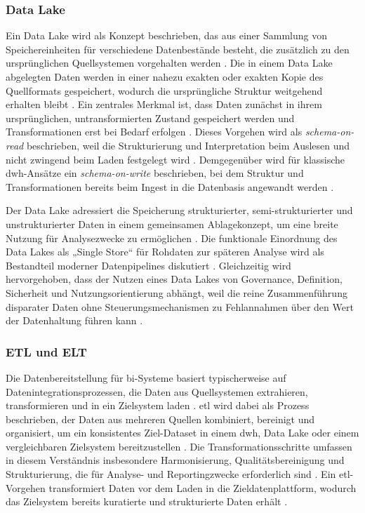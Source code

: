 \subsubsection{Data Lake}
Ein Data Lake wird als Konzept beschrieben, das aus einer Sammlung von Speichereinheiten für verschiedene Datenbestände besteht, die zusätzlich zu den ursprünglichen Quellsystemen vorgehalten werden \cite{GartnerDataLake}. Die in einem Data Lake abgelegten Daten werden in einer nahezu exakten oder exakten Kopie des Quellformats gespeichert, wodurch die ursprüngliche Struktur weitgehend erhalten bleibt \cite{GartnerDataLake}. Ein zentrales Merkmal ist, dass Daten zunächst in ihrem ursprünglichen, untransformierten Zustand gespeichert werden und Transformationen erst bei Bedarf erfolgen \cite{MSDataLakeGuide}. Dieses Vorgehen wird als \emph{schema-on-read} beschrieben, weil die Strukturierung und Interpretation beim Auslesen und nicht zwingend beim Laden festgelegt wird \cite{MSDataLakeGuide}. Demgegenüber wird für klassische \gls{dwh}-Ansätze ein \emph{schema-on-write} beschrieben, bei dem Struktur und Transformationen bereits beim Ingest in die Datenbasis angewandt werden \cite{MSDataLakeGuide}. 

Der Data Lake adressiert die Speicherung strukturierter, semi-strukturierter und unstrukturierter Daten in einem gemeinsamen Ablagekonzept, um eine breite Nutzung für Analysezwecke zu ermöglichen \cite{AWSDataLake}. Die funktionale Einordnung des Data Lakes als „Single Store“ für Rohdaten zur späteren Analyse wird als Bestandteil moderner Datenpipelines diskutiert \cite{Fowler2015DataLake}. Gleichzeitig wird hervorgehoben, dass der Nutzen eines Data Lakes von Governance, Definition, Sicherheit und Nutzungsorientierung abhängt, weil die reine Zusammenführung disparater Daten ohne Steuerungsmechanismen zu Fehlannahmen über den Wert der Datenhaltung führen kann \cite{GartnerDataLakeFallacy}. 

\subsubsection{ETL und ELT}
Die Datenbereitstellung für \gls{bi}-Systeme basiert typischerweise auf Datenintegrationsprozessen, die Daten aus Quellsystemen extrahieren, transformieren und in ein Zielsystem laden \cite{IBMETL}. \gls{etl} wird dabei als Prozess beschrieben, der Daten aus mehreren Quellen kombiniert, bereinigt und organisiert, um ein konsistentes Ziel-Dataset in einem \gls{dwh}, Data Lake oder einem vergleichbaren Zielsystem bereitzustellen \cite{IBMETL}. Die Transformationsschritte umfassen in diesem Verständnis insbesondere Harmonisierung, Qualitätsbereinigung und Strukturierung, die für Analyse- und Reportingzwecke erforderlich sind \cite{IBMETL}. Ein \gls{etl}-Vorgehen transformiert Daten vor dem Laden in die Zieldatenplattform, wodurch das Zielsystem bereits kuratierte und strukturierte Daten erhält \cite{DatabricksETLvsELT}. 

